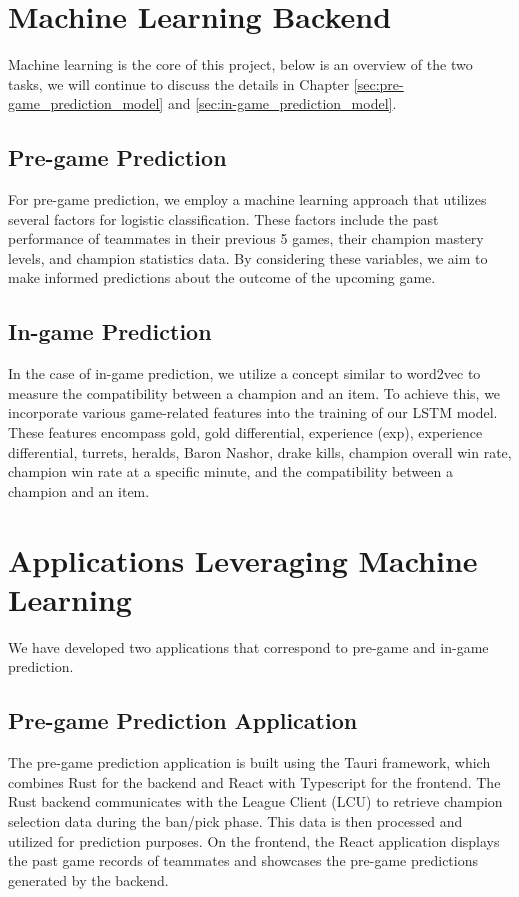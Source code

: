 \documentclass[11pt,a4paper,oneside]{report}
\begin{document}
\section{Machine Learning Backend}

Machine learning is the core of this project, below is an overview of the two tasks, we will continue to discuss the details in Chapter \ref{sec:pre-game_prediction_model} and \ref{sec:in-game_prediction_model}.

\subsection{Pre-game Prediction}

For pre-game prediction, we employ a machine learning approach that utilizes several factors for logistic classification. These factors include the past performance of teammates in their previous 5 games, their champion mastery levels, and champion statistics data. By considering these variables, we aim to make informed predictions about the outcome of the upcoming game.

\subsection{In-game Prediction}

In the case of in-game prediction, we utilize a concept similar to word2vec  \cite{word2vec} to measure the compatibility between a champion and an item. To achieve this, we incorporate various game-related features into the training of our LSTM model. These features encompass gold, gold differential, experience (exp), experience differential, turrets, heralds, Baron Nashor, drake kills, champion overall win rate, champion win rate at a specific minute, and the compatibility between a champion and an item.

\section{Applications Leveraging Machine Learning}

We have developed two applications that correspond to pre-game and in-game prediction.

\subsection{Pre-game Prediction Application}

The pre-game prediction application is built using the Tauri \cite{tauri} framework, which combines Rust \cite{rust} for the backend and React \cite{react} with Typescript \cite{type-script} for the frontend. The Rust backend communicates with the League Client (LCU) to retrieve champion selection data during the ban/pick phase. This data is then processed and utilized for prediction purposes. On the frontend, the React application displays the past game records of teammates and showcases the pre-game predictions generated by the backend.
\end{document}
